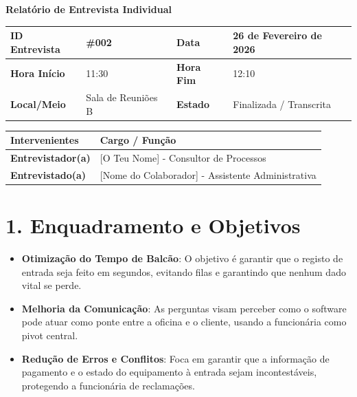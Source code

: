 \documentclass[11pt,a4paper]{article}
\begin{document}
	
	{\noindent\LARGE\bfseries\color{primaryblue} Relatório de Entrevista Individual}
	\\[0.5cm]
	
	\renewcommand{\arraystretch}{1.5}
	\begin{tabularx}{\textwidth}{@{}|l|X|l|X|@{}}
		\hline
		\rowcolor{gray!10} \textbf{ID Entrevista} & \#002 & \textbf{Data} & 26 de Fevereiro de 2026 \\ \hline
		\textbf{Hora Início} & 11:30 & \textbf{Hora Fim} & 12:10 \\ \hline
		\textbf{Local/Meio} & Sala de Reuniões B & \textbf{Estado} & Finalizada / Transcrita \\ \hline
	\end{tabularx}
	
	\vspace{0.5cm}
	
	\begin{tabularx}{\textwidth}{@{}|l|X|@{}}
		\hline
		\rowcolor{gray!10} \textbf{Intervenientes} & \textbf{Cargo / Função} \\ \hline
		\textbf{Entrevistador(a)} & [O Teu Nome] - Consultor de Processos \\ \hline
		\textbf{Entrevistado(a)}  & [Nome do Colaborador] - Assistente Administrativa \\ \hline
	\end{tabularx}
	
	\vspace{0.8cm}
	
	\section*{1. Enquadramento e Objetivos}
	\begin{itemize}[leftmargin=*, label=\small\color{primaryblue}$\blacksquare$]
		\item \textbf{Otimização do Tempo de Balcão}: O objetivo é garantir que o registo de entrada seja feito em segundos, evitando filas e garantindo que nenhum dado vital se perde.
		\item \textbf{Melhoria da Comunicação}: As perguntas visam perceber como o software pode atuar como ponte entre a oficina e o cliente, usando a funcionária como pivot central.
		\item \textbf{Redução de Erros e Conflitos}: Foca em garantir que a informação de pagamento e o estado do equipamento à entrada sejam incontestáveis, protegendo a funcionária de reclamações.
	\end{itemize}
	
\end{document}

